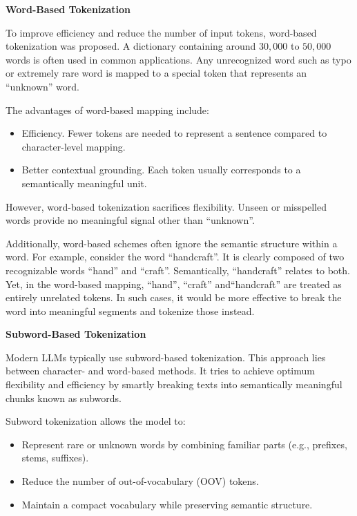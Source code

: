 \vspace{0.1in}
\noindent \textbf{Word-Based Tokenization}
\vspace{0.1in}

To improve efficiency and reduce the number of input tokens, word-based tokenization was proposed. A dictionary containing around $30{,}000$ to $50{,}000$ words is often used in common applications. Any unrecognized word such as typo or extremely rare word is mapped to a special token that represents an ``unknown'' word.

The advantages of word-based mapping include:
\begin{itemize}
	\item Efficiency. Fewer tokens are needed to represent a sentence compared to character-level mapping.
	\item Better contextual grounding. Each token usually corresponds to a semantically meaningful unit.
\end{itemize}

However, word-based tokenization sacrifices flexibility. Unseen or misspelled words provide no meaningful signal other than ``unknown''. 

Additionally, word-based schemes often ignore the semantic structure within a word. For example, consider the word ``handcraft''. It is clearly composed of two recognizable words ``hand'' and ``craft''. Semantically, ``handcraft'' relates to both. Yet, in the word-based mapping, ``hand'', ``craft'' and``handcraft'' are treated as entirely unrelated tokens. In such cases, it would be more effective to break the word into meaningful segments and tokenize those instead.

\vspace{0.1in}
\noindent \textbf{Subword-Based Tokenization}
\vspace{0.1in}

Modern LLMs typically use subword-based tokenization. This approach lies between character- and word-based methods. It tries to achieve optimum flexibility and efficiency by smartly breaking texts into semantically meaningful chunks known as subwords.

Subword tokenization allows the model to:
\begin{itemize}
	\item Represent rare or unknown words by combining familiar parts (e.g., prefixes, stems, suffixes).
	\item Reduce the number of out-of-vocabulary (OOV) tokens.
	\item Maintain a compact vocabulary while preserving semantic structure.
\end{itemize}

